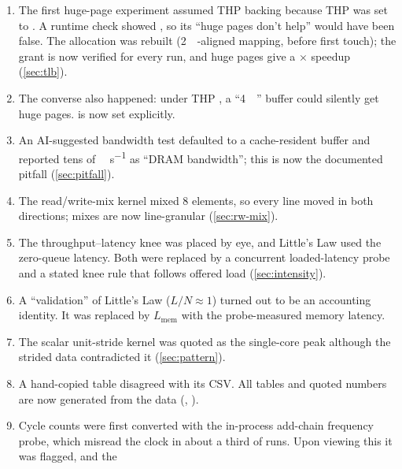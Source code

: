 \begin{description}[style=nextline]
\begin{enumerate}[(1),nosep,leftmargin=*]
                cycle; the sequential curve is kept only as a contrast (\cref{fig:working-set}).
          \item The first huge-page experiment assumed THP backing because THP was set to
                . A runtime  check showed , so
                its ``huge pages don't help'' would have been false. The allocation was rebuilt
                (\qty{2}{\mebi\byte}-aligned mapping,  before first touch); the grant is now
                verified for every run, and huge pages give a $\times$ speedup
                (\cref{sec:tlb}).
          \item The converse also happened: under THP , a ``\qty{4}{\kibi\byte}'' buffer
                could silently get huge pages.  is now set explicitly.
          \item An AI-suggested bandwidth test defaulted to a cache-resident buffer and reported tens of
                \unit{\gibi\byte\per\second} as ``DRAM bandwidth''; this is now the documented pitfall
                (\cref{sec:pitfall}).
          \item The read/write-mix kernel mixed \qty{8}{\byte} elements, so every line moved in both
                directions; mixes are now line-granular (\cref{sec:rw-mix}).
          \item The throughput--latency knee was placed by eye, and Little's Law used the zero-queue
                latency. Both were replaced by a concurrent loaded-latency probe and a stated knee rule
                that follows offered load (\cref{sec:intensity}).
          \item A ``validation'' of Little's Law ($L/N\approx1$) turned out to be an accounting identity.
                It was replaced by $L_{\text{mem}}$ with the probe-measured memory latency.
          \item The scalar unit-stride kernel was quoted as the single-core peak although the strided data
                contradicted it (\cref{sec:pattern}).
          \item A hand-copied table disagreed with its CSV. All tables and quoted numbers are now
                generated from the data (, ).
          \item Cycle counts were first converted with the in-process add-chain frequency probe, which
                misread the clock in about a third of runs. Upon viewing this it was flagged, and the 

\end{enumerate}
\end{description}

